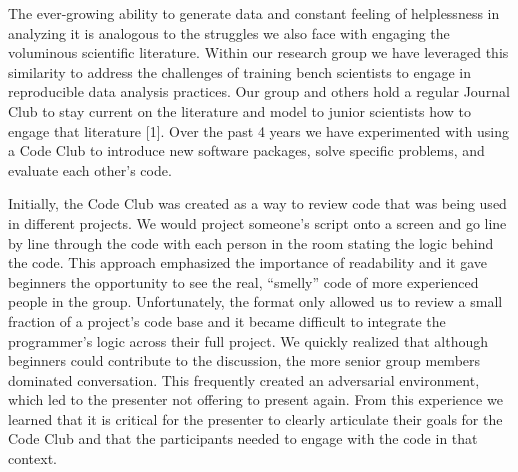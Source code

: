 \documentclass[
  11pt,
]{article}
\begin{document}
The ever-growing ability to generate data and constant feeling of
helplessness in analyzing it is analogous to the struggles we also face
with engaging the voluminous scientific literature. Within our research
group we have leveraged this similarity to address the challenges of
training bench scientists to engage in reproducible data analysis
practices. Our group and others hold a regular Journal Club to stay
current on the literature and model to junior scientists how to engage
that literature {[}1{]}. Over the past 4 years we have experimented with
using a Code Club to introduce new software packages, solve specific
problems, and evaluate each other's code.

Initially, the Code Club was created as a way to review code that was
being used in different projects. We would project someone's script onto
a screen and go line by line through the code with each person in the
room stating the logic behind the code. This approach emphasized the
importance of readability and it gave beginners the opportunity to see
the real, ``smelly'' code of more experienced people in the group.
Unfortunately, the format only allowed us to review a small fraction of
a project's code base and it became difficult to integrate the
programmer's logic across their full project. We quickly realized that
although beginners could contribute to the discussion, the more senior
group members dominated conversation. This frequently created an
adversarial environment, which led to the presenter not offering to
present again. From this experience we learned that it is critical for
the presenter to clearly articulate their goals for the Code Club and
that the participants needed to engage with the code in that context.
\end{document}
